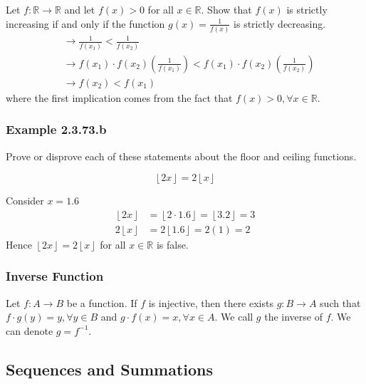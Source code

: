\documentclass{article}
\begin{document}
Let $ f: \mathbb{R} \rightarrow \mathbb{R} $ and let $ f(x) > 0 $ for all $ x \in \mathbb{R} $. Show that $ f(x) $ is strictly increasing if and only if the function $ g(x) = \frac{ 1 }{ f(x) } $ is strictly decreasing.
\begin{align*}
	 & \rightarrow \frac{ 1 }{ f(x_1) } < \frac{ 1 }{ f(x_2) }                                                                       \\
	 & \rightarrow f(x_1) \cdot f(x_2) \left( \frac{ 1 }{ f(x_1) } \right) < f(x_1) \cdot f(x_2) \left( \frac{ 1 }{ f(x_2) } \right) \\
	 & \rightarrow f(x_2) < f(x_1)
\end{align*}
where the first implication comes from the fact that $ f(x) > 0, \forall x \in \mathbb{R} $.

\subsubsection{Example 2.3.73.b}

Prove or disprove each of these statements about the floor and ceiling functions.

\begin{equation*}
	\left\lfloor 2x \right\rfloor = 2 \left\lfloor x \right\rfloor
\end{equation*}

Consider $ x = 1.6 $
\begin{align*}
	\left\lfloor 2x \right\rfloor  & = \left\lfloor 2 \cdot 1.6 \right\rfloor = \left\lfloor 3.2 \right\rfloor = 3 \\
	2 \left\lfloor x \right\rfloor & = 2 \left\lfloor 1.6 \right\rfloor = 2(1) = 2
\end{align*}
Hence $ \left\lfloor 2x \right\rfloor = 2 \left\lfloor x \right\rfloor $ for all $ x \in \mathbb{R} $ is false.

\subsubsection{Inverse Function}

Let $ f: A \rightarrow B $ be a function. If $ f $ is injective, then there exists $ g: B \rightarrow A $ such that $ f \cdot g \left( y \right) = y, \forall y \in B $ and $ g \cdot f \left( x \right) = x, \forall x \in A $. We call $ g $ the inverse of $ f $. We can denote $ g = f^{-1} $.

\subsection{Sequences and Summations}
\end{document}
